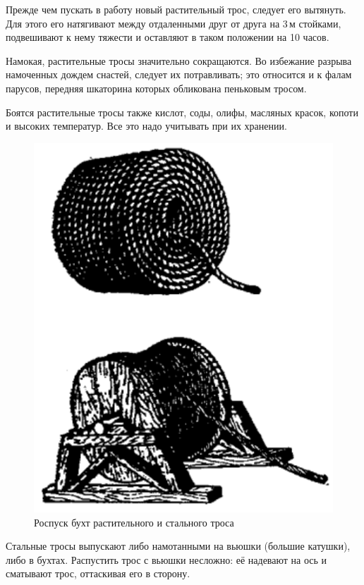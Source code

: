 \documentclass[a4paper, 12pt, twoside, final]{scrbook}
\begin{document}
Прежде чем пускать в работу новый растительный трос, следует его вытянуть. Для этого его натягивают между отдаленными друг от друга на 3\,м стойками, подвешивают к нему тяжести и оставляют в таком положении на 10 часов.

Намокая, растительные тросы значительно сокращаются. Во избежание разрыва намоченных дождем снастей, следует их потравливать; это относится и к фалам парусов, передняя шкаторина которых обликована пеньковым тросом.

Боятся растительные тросы также кислот, соды, олифы, масляных красок, копоти и высоких температур. Все это надо учитывать при их хранении.

\begin{figure}
   \centering
   \includegraphics{57_Rospusk_buht} %
   \caption{Роспуск бухт растительного и стального троса}
   \label{fig:57}
\end{figure}

Стальные тросы выпускают либо намотанными на вьюшки (большие катушки), либо в бухтах. Распустить трос с вьюшки несложно: её надевают на ось и сматывают трос, оттаскивая его в сторону.
\end{document}
